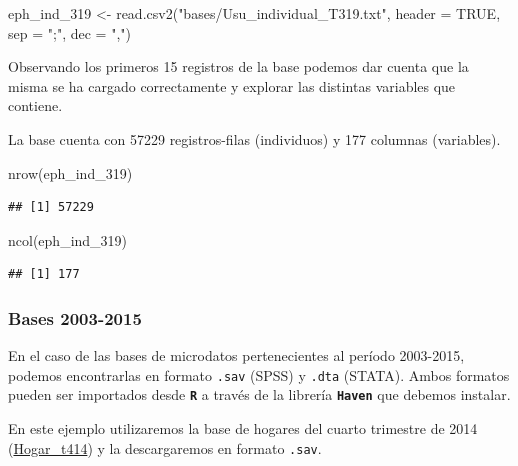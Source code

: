 \documentclass[
]{book}
\newenvironment{Shaded}{\begin{snugshade}}{\end{snugshade}}
\newcommand{\AttributeTok}[1]{\textcolor[rgb]{0.77,0.63,0.00}{#1}}
\newcommand{\ConstantTok}[1]{\textcolor[rgb]{0.00,0.00,0.00}{#1}}
\newcommand{\FunctionTok}[1]{\textcolor[rgb]{0.00,0.00,0.00}{#1}}
\newcommand{\NormalTok}[1]{#1}
\newcommand{\OtherTok}[1]{\textcolor[rgb]{0.56,0.35,0.01}{#1}}
\newcommand{\StringTok}[1]{\textcolor[rgb]{0.31,0.60,0.02}{#1}}
\begin{document}
\begin{Shaded}
\begin{Highlighting}[]
\NormalTok{eph\_ind\_319 }\OtherTok{\textless{}{-}} \FunctionTok{read.csv2}\NormalTok{(}\StringTok{"bases/Usu\_individual\_T319.txt"}\NormalTok{, }\AttributeTok{header =} \ConstantTok{TRUE}\NormalTok{, }\AttributeTok{sep =} \StringTok{";"}\NormalTok{, }\AttributeTok{dec =} \StringTok{","}\NormalTok{)}
\end{Highlighting}
\end{Shaded}

Observando los primeros 15 registros de la base podemos dar cuenta que la misma se ha cargado correctamente y explorar las distintas variables que contiene.

La base cuenta con 57229 registros-filas (individuos) y 177 columnas (variables).

\begin{Shaded}
\begin{Highlighting}[]
\FunctionTok{nrow}\NormalTok{(eph\_ind\_319)}
\end{Highlighting}
\end{Shaded}

\begin{verbatim}
## [1] 57229
\end{verbatim}

\begin{Shaded}
\begin{Highlighting}[]
\FunctionTok{ncol}\NormalTok{(eph\_ind\_319)}
\end{Highlighting}
\end{Shaded}

\begin{verbatim}
## [1] 177
\end{verbatim}

\hypertarget{bases-2003-2015}{%
\subsubsection{Bases 2003-2015}\label{bases-2003-2015}}

En el caso de las bases de microdatos pertenecientes al período 2003-2015, podemos encontrarlas en formato \texttt{.sav} (SPSS) y \texttt{.dta} (STATA). Ambos formatos pueden ser importados desde \textbf{\texttt{R}} a través de la librería \textbf{\texttt{Haven}} que debemos instalar.

En este ejemplo utilizaremos la base de hogares del cuarto trimestre de 2014 (\href{https://www.indec.gob.ar/ftp/cuadros/menusuperior/eph/t414_sav.rar}{Hogar\_t414}) y la descargaremos en formato \texttt{.sav}.
\end{document}
